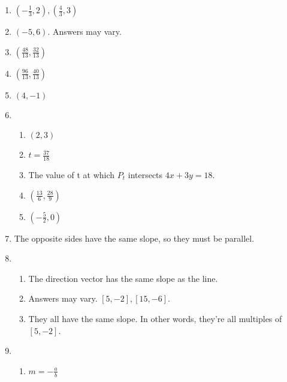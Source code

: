 \documentclass{article}
\begin{document}
\begin{enumerate}
\item $(-\frac{1}{3}, 2), (\frac{4}{3}, 3)$

\item $(-5, 6)$. Answers may vary.

\item $(\frac{48}{13}, \frac{32}{13})$

\item $(\frac{96}{13}, \frac{40}{13})$

\item $(4, -1)$

\item

	\begin{enumerate}
	
	\item $(2, 3)$
	
	\item $t = \frac{37}{18}$
	
	\item The value of t at which $P_t$ intersects $4x + 3y = 18$.
	
	\item $(\frac{13}{6}, \frac{28}{9})$
	
	\item $(-\frac{5}{2}, 0)$
	
	\end{enumerate}
	
\item The opposite sides have the same slope, so they must be parallel.

\item

	\begin{enumerate}
	
	\item The direction vector has the same slope as the line.
	
	\item Answers may vary. $[5, -2], [15, -6]$.
	
	\item They all have the same slope. In other words, they're all multiples of $[5, -2]$.
	
	\end{enumerate}
	
\item

	\begin{enumerate}
	
	\item $m = -\frac{a}{b}$
	

\end{enumerate}
\end{enumerate}
\end{document}
